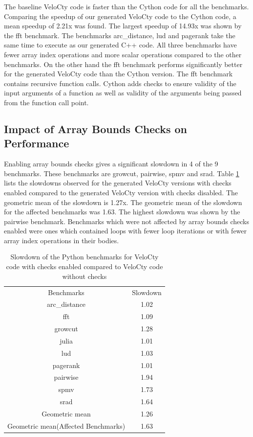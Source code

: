 The baseline VeloCty code is faster than the Cython code for all the benchmarks. Comparing the speedup of our generated VeloCty code to the Cython code, a mean speedup of 2.21x was found. The largest speedup of 14.93x was shown by the \textsf{fft} benchmark. The benchmarks \textsf{arc\_distance}, \textsf{lud} and \textsf{pagerank} take the same time to execute as our generated C++ code. All three benchmarks have fewer array index operations and more scalar operations compared to the other benchmarks. On the other hand the \textsf{fft} benchmark performs significantly better for the generated VeloCty code than the Cython version. The \textsf{fft} benchmark contains recursive function calls. Cython adds checks to ensure validity of the input arguments of a function as well as validity of the arguments being passed from the function call point. 

\subsection{Impact of Array Bounds Checks on Performance}
Enabling array bounds checks gives a significant slowdown in 4 of the 9 benchmarks. These benchmarks are \textsf{growcut}, \textsf{pairwise}, \textsf{spmv} and \textsf{srad}. Table \ref{tab:cwvscwopy} lists the slowdowns observed for the generated VeloCty versions with checks enabled compared to the generated VeloCty version with checks disabled. The geometric mean of the slowdown is 1.27x. The geometric mean of the slowdown for the affected benchmarks was 1.63. The highest slowdown was shown by the \textsf{pairwise} benchmark. Benchmarks which were not affected by array bounds checks enabled were ones which contained loops with fewer loop iterations or with fewer array index operations in their bodies. 
\begin{table}[htbp]
\centering
\begin{tabular}{|c|c|}
\hline
Benchmarks     & Slowdown    \\ \hhline{|=|=|}
arc\_distance  & 1.02\\ \hline
fft            & 1.09\\ \hline
growcut        & 1.28\\ \hline
julia          & 1.01\\ \hline
lud            & 1.03\\ \hline
pagerank       & 1.01\\ \hline
pairwise       & 1.94\\ \hline
spmv           & 1.73\\ \hline
srad           & 1.64\\ \hline
Geometric mean & 1.26\\ \hline
Geometric mean(Affected Benchmarks)  &  1.63 \\ \hline
\end{tabular}
\caption{Slowdown of the Python benchmarks for VeloCty code with checks enabled compared to VeloCty code without checks}
\label{tab:cwvscwopy}
\end{table}
